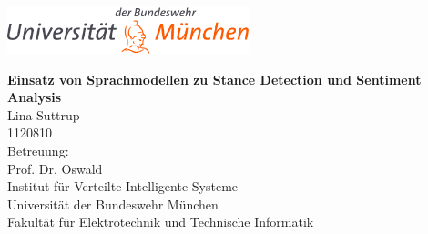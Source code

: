 \thispagestyle{empty}
\vspace*{-2ex}

\centerline{\includegraphics[width=7cm]{pics/athene.png}}
\vspace{4cm}

\begin{center}

\begin{minipage}[t]{17cm} 
\begin{center}
{\LARGE\bf Einsatz von Sprachmodellen zu Stance Detection und Sentiment Analysis}\\[1cm]
Lina Suttrup\\
1120810\\[5mm]  


\vspace*{5cm}
Betreuung:\\
Prof. Dr. Oswald \\[4cm]

Institut f\"ur Verteilte Intelligente Systeme\\
Universit\"at der Bundeswehr M\"unchen\\
Fakult\"at f\"ur Elektrotechnik und Technische Informatik\\

\end{center}
\end{minipage}  
\end{center}           

